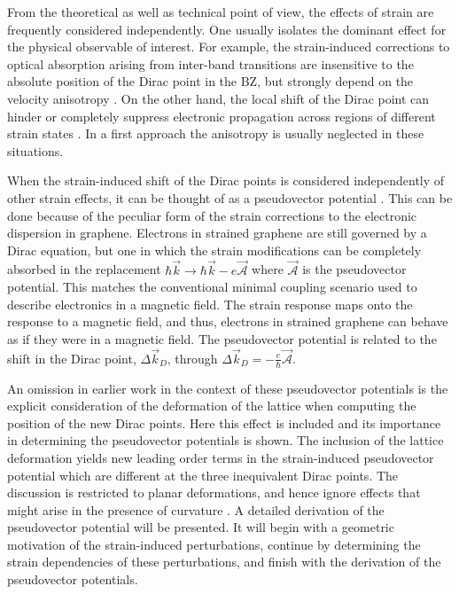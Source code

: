 From the theoretical as well as technical point of view, the effects of strain are frequently considered independently.
One usually isolates the dominant effect for the physical observable of interest.
For example, the strain-induced corrections to optical absorption arising from inter-band transitions are insensitive to the absolute position of the Dirac point in the BZ, but strongly depend on the velocity anisotropy \cite{Pereira2010c,Pellegrino2010}.
On the other hand, the local shift of the Dirac point can hinder or completely suppress electronic propagation across regions of different strain states \cite{Pereira2009a,Fogler2008}.
In a first approach the anisotropy is usually neglected in these situations\cite{Fogler2008,Pereira2009a}.

When the strain-induced shift of the Dirac points is considered independently of other strain effects, it can be thought of as a pseudovector potential \cite{Sasaki2005,Ando2006,Manes2007,CastroNeto2009,Vozmediano2010}.
This can be done because of the peculiar form of the strain corrections to the electronic dispersion in graphene.
Electrons in strained graphene are still governed by a Dirac equation, but one in which the strain modifications can be completely absorbed in the replacement $\hbar \vec{k} \to \hbar \vec{k}-e \vec{\mathcal{A}}$ where $\vec{\mathcal{A}}$ is the pseudovector potential.
This matches the conventional minimal coupling scenario used to describe electronics in a magnetic field.
The strain response maps onto the response to a magnetic field, and thus, electrons in strained graphene can behave as if they were in a magnetic field.  
The pseudovector potential is related to the shift in the Dirac point, $\Delta \vec{k}_D$, through $\Delta \vec{k}_D=-\frac{e}{\hbar} \vec{\mathcal{A}}$.

An omission in earlier work in the context of these pseudovector potentials is the explicit consideration of the deformation of the lattice when computing the position of the new Dirac points.
Here this effect is included and its importance in determining the pseudovector potentials is shown.
The inclusion of the lattice deformation yields new leading order terms in the strain-induced pseudovector potential which are different at the three inequivalent Dirac points.
The discussion is restricted to planar deformations, and hence ignore effects that might arise in the presence of curvature \cite{CastroNeto2009,Vozmediano2010}.
A detailed derivation of the pseudovector potential will be presented.
It will begin with a geometric motivation of the strain-induced perturbations, continue by determining the strain dependencies of these perturbations, and finish with the derivation of the pseudovector potentials.

